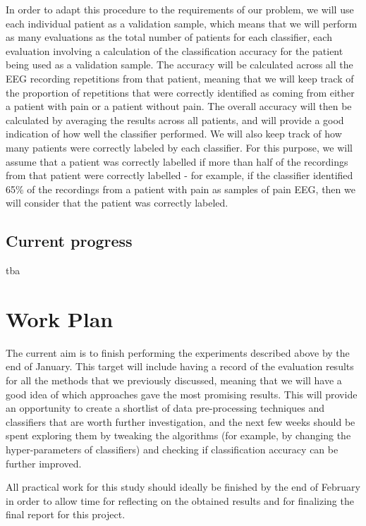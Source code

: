 \documentclass{mprop}
\begin{document}
In order to adapt this procedure to the requirements of our problem, we will use each individual patient as a validation sample, which means that we will perform as many evaluations as the total number of patients for each classifier, each evaluation involving a calculation of the classification accuracy for the patient being used as a validation sample. The accuracy will be calculated across all the EEG recording repetitions from that patient, meaning that we will keep track of the proportion of repetitions that were correctly identified as coming from either a patient with pain or a patient without pain. The overall accuracy will then be calculated by averaging the results across all patients, and will provide a good indication of how well the classifier performed. We will also keep track of how many patients were correctly labeled by each classifier. For this purpose, we will assume that a patient was correctly labelled if more than half of the recordings from that patient were correctly labelled - for example, if the classifier identified 65\% of the recordings from a patient with pain as samples of pain EEG, then we will consider that the patient was correctly labeled.

\subsection{Current progress}

tba

\section{Work Plan}

The current aim is to finish performing the experiments described above by the end of January. This target will include having a record of the evaluation results for all the methods that we previously discussed, meaning that we will have a good idea of which approaches gave the most promising results. This will provide an opportunity to create a shortlist of data pre-processing techniques and classifiers that are worth further investigation, and the next few weeks should be spent exploring them by tweaking the algorithms (for example, by changing the hyper-parameters of classifiers) and checking if classification accuracy can be further improved.

All practical work for this study should ideally be finished by the end of February in order to allow time for reflecting on the obtained results and for finalizing the final report for this project.



\end{document}
